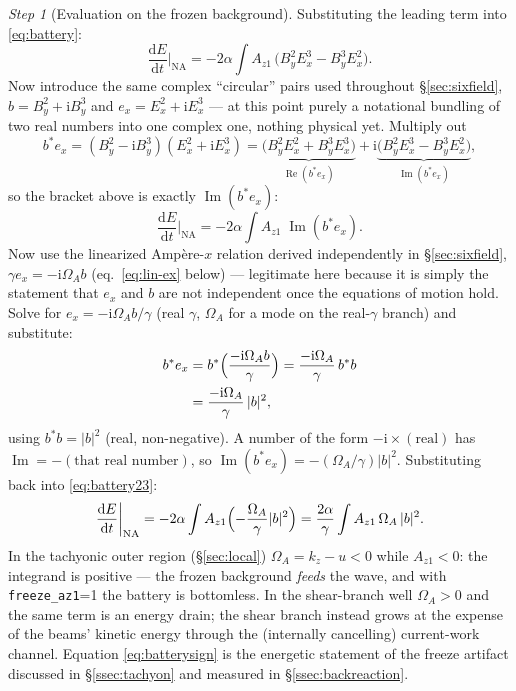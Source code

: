 \documentclass[11pt,a4paper]{article}
\numberwithin{equation}{section}
\theoremstyle{remark}
\newtheorem{step}{Step}[subsection]
\newcommand{\kz}{k_z}
\newcommand{\OmA}{\Omega_A}
\newcommand{\Az}{A_{z1}}
\newcommand{\dd}{\mathrm{d}}
\newcommand{\ii}{\mathrm{i}}
\newcommand{\Rey}{\operatorname{Re}}
\newcommand{\Imy}{\operatorname{Im}}
\begin{document}
\begin{step}[Evaluation on the frozen background]
Substituting the leading term into \eqref{eq:battery}:
\begin{equation}
\frac{\dd E}{\dd t}\bigg|_{\mathrm{NA}}
=-2\alpha\int \Az\,\bigl(B_y^2E_x^3-B_y^3E_x^2\bigr).
\end{equation}
Now introduce the same complex ``circular'' pairs used throughout
\S\ref{sec:sixfield}, $b=B_y^2+\ii B_y^3$ and $e_x=E_x^2+\ii E_x^3$ --- at
this point purely a notational bundling of two real numbers into one
complex one, nothing physical yet. Multiply out
\begin{equation}
b^{*}e_x=(B_y^2-\ii B_y^3)(E_x^2+\ii E_x^3)
=\underbrace{\bigl(B_y^2E_x^2+B_y^3E_x^3\bigr)}_{\Rey(b^*e_x)}
+\ii\underbrace{\bigl(B_y^2E_x^3-B_y^3E_x^2\bigr)}_{\Imy(b^*e_x)},
\end{equation}
so the bracket above is exactly $\Imy(b^*e_x)$:
\begin{equation}
\frac{\dd E}{\dd t}\bigg|_{\mathrm{NA}}
=-2\alpha\int\Az\;\Imy\!\left(b^{*}e_x\right).
\label{eq:battery23}
\end{equation}
Now use the linearized Amp\`ere-$x$ relation derived independently in
\S\ref{sec:sixfield}, $\gamma e_x=-\ii\OmA b$ (eq.~\eqref{eq:lin-ex} below)
--- legitimate here because it is simply the statement that $e_x$ and $b$
are not independent once the equations of motion hold. Solve for
$e_x=-\ii\OmA b/\gamma$ (real $\gamma$, $\OmA$ for a mode on the
real-$\gamma$ branch) and substitute:
\begin{align}
b^*e_x&=b^*\Bigl(\frac{-\ii\OmA b}{\gamma}\Bigr)
=\frac{-\ii\OmA}{\gamma}\,b^*b\notag\\
&=\frac{-\ii\OmA}{\gamma}\,|b|^2,
\end{align}
using $b^*b=|b|^2$ (real, non-negative). A number of the form
$-\ii\times(\text{real})$ has $\Imy=-(\text{that real number})$, so
$\Imy(b^*e_x)=-(\OmA/\gamma)|b|^2$. Substituting back into
\eqref{eq:battery23}:
\begin{equation}
\frac{\dd E}{\dd t}\bigg|_{\mathrm{NA}}
=-2\alpha\int\Az\Bigl(-\frac{\OmA}{\gamma}|b|^2\Bigr)
=\frac{2\alpha}{\gamma}\int\Az\,\OmA\,|b|^2 .
\label{eq:batterysign}
\end{equation}
In the tachyonic outer region (\S\ref{sec:local}) $\OmA=\kz-u<0$ while
$\Az<0$: the integrand is positive --- the frozen background \emph{feeds}
the wave, and with \texttt{freeze\_az1}=1 the battery is bottomless. In the
shear-branch well $\OmA>0$ and the same term is an energy drain; the shear
branch instead grows at the expense of the beams' kinetic energy through the
(internally cancelling) current-work channel. Equation
\eqref{eq:batterysign} is the energetic statement of the freeze artifact
discussed in \S\ref{ssec:tachyon} and measured in \S\ref{ssec:backreaction}.
\end{step}
\end{document}
